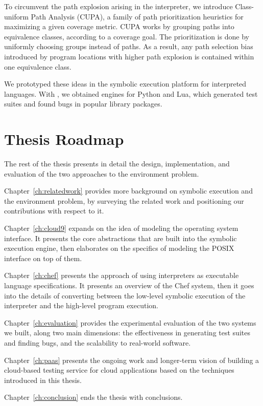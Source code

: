 To circumvent the path explosion arising in the interpreter, we introduce Class-uniform Path Analysis (CUPA), a family of path prioritization heuristics for maximizing a given coverage metric.
%
CUPA works by grouping paths into equivalence classes, according to a coverage goal.  The prioritization is done by uniformly choosing groups instead of paths.  As a result, any path selection bias introduced by program locations with higher path explosion is contained within one equivalence class.

We prototyped these ideas in the \chef symbolic execution platform for interpreted languages.  With \chef, we obtained engines for Python and Lua, which generated test suites and found bugs in popular library packages.


\section{Thesis Roadmap}

The rest of the thesis presents in detail the design, implementation, and evaluation of the two approaches to the environment problem.

Chapter~\ref{ch:relatedwork} provides more background on symbolic execution and the environment problem, by surveying the related work and positioning our contributions with respect to it.

Chapter~\ref{ch:cloud9} expands on the idea of modeling the operating system interface.  It presents the core abstractions that are built into the symbolic execution engine, then elaborates on the specifics of modeling the POSIX interface on top of them.

Chapter~\ref{ch:chef} presents the approach of using interpreters as executable language specifications.  It presents an overview of the Chef system, then it goes into the details of converting between the low-level symbolic execution of the interpreter and the high-level program execution.

Chapter~\ref{ch:evaluation} provides the experimental evaluation of the two systems we built, along two main dimensions: the effectiveness in generating test suites and finding bugs, and the scalability to real-world software.

Chapter~\ref{ch:paas} presents the ongoing work and longer-term vision of building a cloud-based testing service for cloud applications based on the techniques introduced in this thesis.

Chapter~\ref{ch:conclusion} ends the thesis with conclusions.

